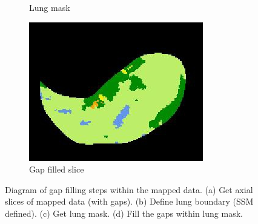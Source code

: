 \begin{figure}[htbp]
\begin{subfigure}{.28\linewidth}
  \caption{Lung mask}
  \label{fig:GapFilling-c} 
\end{subfigure}
\hspace{.5in} %
\begin{subfigure}{.28\linewidth}%
  \includegraphics[width=\linewidth,trim={{.0\wd0} {.0\wd0} {.0\wd0} {.0\wd0}},clip]{QuantitativeAnalysis/Image/GapFilling4.jpg}
  \caption{Gap filled slice}
  \label{fig:GapFilling-d} 
\end{subfigure}
\caption{Diagram of gap filling steps within the mapped data. (a) Get axial slices of mapped data (with gaps). (b) Define lung boundary (SSM defined). (c) Get lung mask. (d) Fill the gaps within lung mask.}
\label{fig:GapFilling}
\end{figure}

